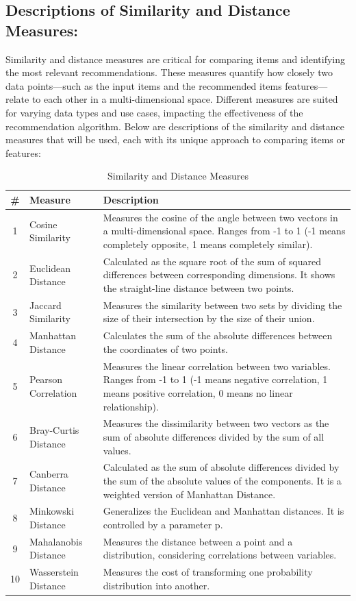 \documentclass[\myFontSize,oneside,english,hidelinks,a4paper]{article}
\begin{document}
\subsection{Descriptions of Similarity and Distance Measures:}
Similarity and distance measures are critical for comparing items and identifying the most relevant recommendations. These measures quantify how closely two data points—such as the input items and the recommended items features—relate to each other in a multi-dimensional space. Different measures are suited for varying data types and use cases, impacting the effectiveness of the recommendation algorithm. Below are descriptions of the similarity and distance measures that will be used, each with its unique approach to comparing items or features:
%
%
\begin{table}[H]
\centering
\renewcommand{\arraystretch}{1.5}
{\large
\begin{tabular}{|c|p{}|p{}|}
\hline
\textbf{\#} & \textbf{Measure} & \textbf{Description} \\ \hline
1 & Cosine Similarity & Measures the cosine of the angle between two vectors in a multi-dimensional space. Ranges from -1 to 1 (-1 means completely opposite, 1 means completely similar). \\ \hline
2 & Euclidean Distance & Calculated as the square root of the sum of squared differences between corresponding dimensions. It shows the straight-line distance between two points. \\ \hline
3 & Jaccard Similarity & Measures the similarity between two sets by dividing the size of their intersection by the size of their union. \\ \hline
4 & Manhattan Distance & Calculates the sum of the absolute differences between the coordinates of two points. \\ \hline
5 & Pearson Correlation & Measures the linear correlation between two variables. Ranges from -1 to 1 (-1 means negative correlation, 1 means positive correlation, 0 means no linear relationship). \\ \hline
6 & Bray-Curtis Distance & Measures the dissimilarity between two vectors as the sum of absolute differences divided by the sum of all values. \\ \hline
7 & Canberra Distance & Calculated as the sum of absolute differences divided by the sum of the absolute values of the components. It is a weighted version of Manhattan Distance. \\ \hline
8 & Minkowski Distance & Generalizes the Euclidean and Manhattan distances. It is controlled by a parameter p. \\ \hline
9 & Mahalanobis Distance & Measures the distance between a point and a distribution, considering correlations between variables. \\ \hline
10 & Wasserstein Distance & Measures the cost of transforming one probability distribution into another. \\ \hline
\end{tabular}
}
\caption{Similarity and Distance Measures}
\label{tab:similarity_measures}
\end{table}
%
%
%
%
%
%
\end{document}
